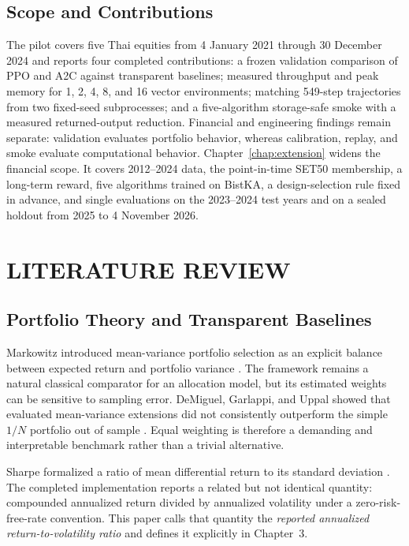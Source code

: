 \documentclass[12pt,a4paper,oneside]{book}
\begin{document}
\section{Scope and Contributions}

The pilot covers five Thai equities from 4 January 2021 through 30 December 2024 and reports four completed contributions: a frozen validation comparison of PPO and A2C against transparent baselines; measured throughput and peak memory for 1, 2, 4, 8, and 16 vector environments; matching 549-step trajectories from two fixed-seed subprocesses; and a five-algorithm storage-safe smoke with a measured returned-output reduction. Financial and engineering findings remain separate: validation evaluates portfolio behavior, whereas calibration, replay, and smoke evaluate computational behavior. Chapter~\ref{chap:extension} widens the financial scope. It covers 2012--2024 data, the point-in-time SET50 membership, a long-term reward, five algorithms trained on BistKA, a design-selection rule fixed in advance, and single evaluations on the 2023--2024 test years and on a sealed holdout from 2025 to 4 November 2026.

\FloatBarrier

\chapter{LITERATURE REVIEW}

\section{Portfolio Theory and Transparent Baselines}

Markowitz introduced mean-variance portfolio selection as an explicit balance between expected return and portfolio variance \cite{markowitz1952}. The framework remains a natural classical comparator for an allocation model, but its estimated weights can be sensitive to sampling error. DeMiguel, Garlappi, and Uppal showed that evaluated mean-variance extensions did not consistently outperform the simple $1/N$ portfolio out of sample \cite{demiguel2009naive}. Equal weighting is therefore a demanding and interpretable benchmark rather than a trivial alternative.

Sharpe formalized a ratio of mean differential return to its standard deviation \cite{sharpe1994}. The completed implementation reports a related but not identical quantity: compounded annualized return divided by annualized volatility under a zero-risk-free-rate convention. This paper calls that quantity the \emph{reported annualized return-to-volatility ratio} and defines it explicitly in Chapter~3.
\end{document}
